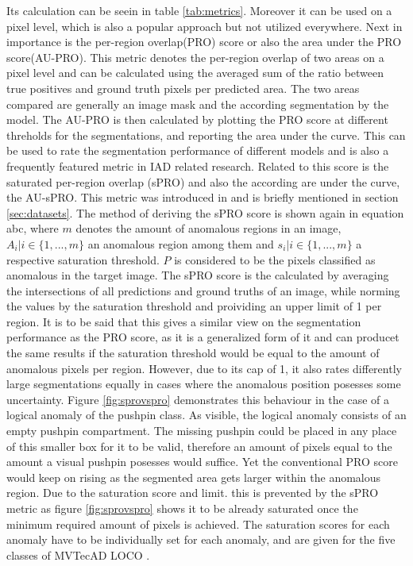 Its calculation can be seein in 
table \ref{tab:metrics}. Moreover it can be used on a pixel level, which is also a popular approach but not utilized everywhere.
Next in importance is the per-region overlap(PRO) score or also the area under the PRO score(AU-PRO). This metric denotes the per-region overlap of two areas 
on a pixel level and can be calculated using the averaged sum of the ratio between true positives and ground truth pixels per predicted area. The two areas 
compared are generally an image mask and the according segmentation by the model. The AU-PRO is then calculated by plotting the PRO score 
at different threholds for the segmentations, and reporting the area under the curve. This can be 
used to rate the segmentation performance of different models and is also a frequently featured metric in IAD related research. 
Related to this score is the saturated per-region overlap (sPRO) and also the according are under the curve, the AU-sPRO. This metric was 
introduced in \cite{LOCODentsAndScratchesBergmann2022} and is briefly mentioned in section \ref{sec:datasets}. The method of deriving the sPRO 
score is shown again in equation abc, where $m$ denotes the amount of anomalous regions in an image, $A_i | i \in \{1, ... , m\}$ an anomalous 
region among them and $s_i | i \in \{1, ... , m\}$ a respective saturation threshold. $P$ is considered to be the pixels classified as anomalous 
in the target image. The sPRO score is the calculated by averaging the intersections of all predictions and ground truths of an image, 
while norming the values by the saturation threshold and proividing an upper limit of 1 per region. It is to be said that this gives a similar 
view on the segmentation performance as the PRO score, as it is a generalized form of it and can producet the same results if the saturation 
threshold would be equal to the amount of anomalous pixels per region. However, due to its cap of 1, it also rates differently large segmentations equally in cases 
where the anomalous position posesses some uncertainty. Figure \ref{fig:sprovspro} demonstrates this behaviour in the case of a logical anomaly of the pushpin class. 
As visible, the logical anomaly consists of an empty pushpin compartment. The missing pushpin could be placed in any place of this smaller 
box for it to be valid, therefore an amount of pixels equal to the amount a visual pushpin posesses would suffice. Yet the conventional PRO score 
would keep on rising as the segmented area gets larger within the anomalous region. Due to the saturation score and limit. this is prevented 
by the sPRO metric as figure \ref{fig:sprovspro} shows it to be already saturated once the minimum required amount of pixels is achieved. The saturation 
scores for each anomaly have to be individually set for each anomaly, and are given for the five classes of MVTecAD LOCO \cite{LOCODentsAndScratchesBergmann2022}.

